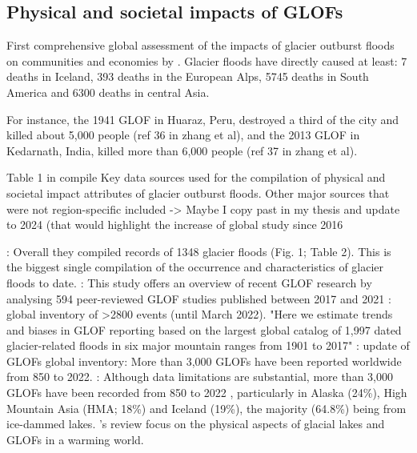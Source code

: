 \subsection{Physical and societal impacts of GLOFs}%


First comprehensive global assessment of the impacts of glacier outburst floods on communities and economies by \cite{Carrivick&Tweed2016}. Glacier floods have directly caused at least: 7 deaths in Iceland, 393 deaths in the European Alps, 5745 deaths in South America and 6300 deaths in central Asia.

For instance, the 1941 GLOF in Huaraz, Peru, destroyed a third of the city and killed about 5,000 people (ref 36 in zhang et al), and the 2013 GLOF in Kedarnath, India, killed more than 6,000 people (ref 37 in zhang et al).

Table 1 in \cite{Carrivick&Tweed2016} compile Key data sources used for the compilation of physical and societal impact attributes of glacier outburst floods. Other major sources that were not region-specific included -> Maybe I copy past in my thesis and update to 2024 (that would highlight the increase of global study since 2016 \citep[e.g][]{Livingstone&al2022,Veh&al2022,Zhang&al2024}


\cite{Carrivick&Tweed2016}: Overall they compiled records of 1348 glacier floods (Fig. 1; Table 2). This is the biggest single compilation of the occurrence and characteristics of glacier floods to date.
\cite{Emmer&al2022}: This study offers an overview of recent GLOF research by analysing 594 peer-reviewed GLOF studies published between 2017 and 2021
\cite{Veh&al2022}: global inventory of >2800 events (until March 2022). "Here we estimate trends and biases in GLOF reporting based on the largest global catalog of 1,997 dated glacier-related floods in six major mountain ranges from 1901 to 2017" %
\cite{Lutzow&al2023}: update of GLOFs global inventory: More than 3,000 GLOFs have been reported worldwide from 850 to 2022.
\cite{Zhang&al2024}: Although data limitations are substantial, more than 3,000 GLOFs have been recorded
from 850 to 2022 \citep{Lutzow&al2023}, particularly in Alaska (24\%), High Mountain Asia (HMA; 18\%) and Iceland (19\%), the majority (64.8\%) being from ice-dammed lakes. %
\cite{Zhang&al2024}'s review focus on the physical aspects of glacial lakes and GLOFs in a warming world.

